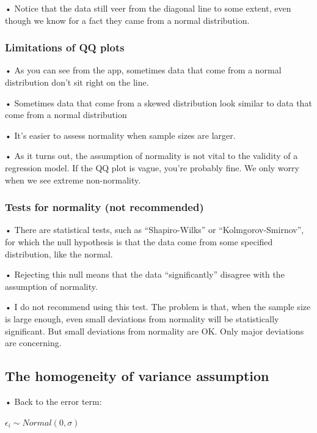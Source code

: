 \documentclass[
  letterpaper,
  DIV=11,
  numbers=noendperiod]{scrreprt}
\begin{document}
• Notice that the data still veer from the diagonal line to some extent,
even though we know for a fact they came from a normal distribution.

\hypertarget{limitations-of-qq-plots}{%
\subsubsection{Limitations of QQ plots}\label{limitations-of-qq-plots}}

• As you can see from the app, sometimes data that come from a normal
distribution don't sit right on the line.

• Sometimes data that come from a skewed distribution look similar to
data that come from a normal distribution

• It's easier to assess normality when sample sizes are larger.

• As it turns out, the assumption of normality is not vital to the
validity of a regression model. If the QQ plot is vague, you're probably
fine. We only worry when we see extreme non-normality.

\hypertarget{tests-for-normality-not-recommended}{%
\subsubsection{Tests for normality (not
recommended)}\label{tests-for-normality-not-recommended}}

• There are statistical tests, such as ``Shapiro-Wilks'' or
``Kolmgorov-Smirnov'', for which the null hypothesis is that the data
come from some specified distribution, like the normal.

• Rejecting this null means that the data ``significantly'' disagree
with the assumption of normality.

• I do not recommend using this test. The problem is that, when the
sample size is large enough, even small deviations from normality will
be statistically significant. But small deviations from normality are
OK. Only major deviations are concerning.

\hypertarget{the-homogeneity-of-variance-assumption}{%
\subsection{The homogeneity of variance
assumption}\label{the-homogeneity-of-variance-assumption}}

• Back to the error term:

\(\epsilon_i \sim Normal(0, \sigma)\)
\end{document}
